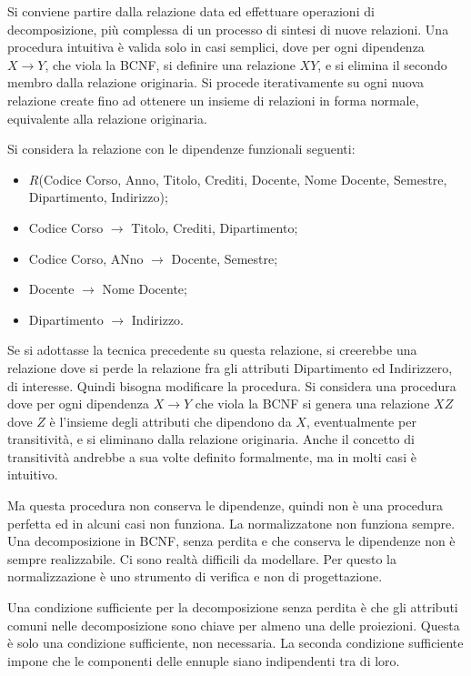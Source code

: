 \documentclass{article}
\numberwithin{equation}{subsection}
\begin{document}
Si conviene partire dalla relazione data ed effettuare operazioni di decomposizione, più complessa di un processo di sintesi di nuove relazioni. 
Una procedura intuitiva è valida solo in casi semplici, dove per ogni dipendenza $X\to Y$, che viola la BCNF, si definire una relazione $XY$, e si elimina il secondo membro  
dalla relazione originaria. Si procede iterativamente su ogni nuova relazione create fino ad ottenere un insieme di relazioni in forma normale, equivalente alla 
relazione originaria. 

Si considera la relazione con le dipendenze funzionali seguenti:
\begin{itemize}
    \item $R$(Codice Corso, Anno, Titolo, Crediti, Docente, Nome Docente, Semestre, Dipartimento, Indirizzo);
    \item Codice Corso $\to$ Titolo, Crediti, Dipartimento;
    \item Codice Corso, ANno $\to$ Docente, Semestre;
    \item Docente $\to$ Nome Docente;
    \item Dipartimento $\to$ Indirizzo. 
\end{itemize}

Se si adottasse la tecnica precedente su questa relazione, si creerebbe una relazione dove si perde la relazione fra gli attributi Dipartimento ed Indirizzero, di 
interesse. Quindi bisogna modificare la procedura. 
Si considera una procedura dove per ogni dipendenza $X\to Y$ che viola la BCNF si genera una relazione $XZ$ dove $Z$ è l'insieme degli attributi che 
dipendono da $X$, eventualmente per transitività, e si eliminano dalla relazione originaria. Anche il concetto di transitività andrebbe a sua volte definito 
formalmente, ma in molti casi è intuitivo. 

Ma questa procedura non conserva le dipendenze, quindi non è una procedura perfetta ed in alcuni casi non funziona. La normalizzatone non funziona sempre. Una 
decomposizione in BCNF, senza perdita e che conserva le dipendenze non è sempre realizzabile. Ci sono realtà difficili da modellare. Per questo la normalizzazione è 
uno strumento di verifica e non di progettazione. 

Una condizione sufficiente per la decomposizione senza perdita è che gli attributi comuni nelle decomposizione sono chiave per almeno una delle proiezioni. Questa è 
solo una condizione sufficiente, non necessaria. La seconda condizione sufficiente impone che le componenti 
delle ennuple siano indipendenti tra di loro. 


\clearpage
\end{document}
